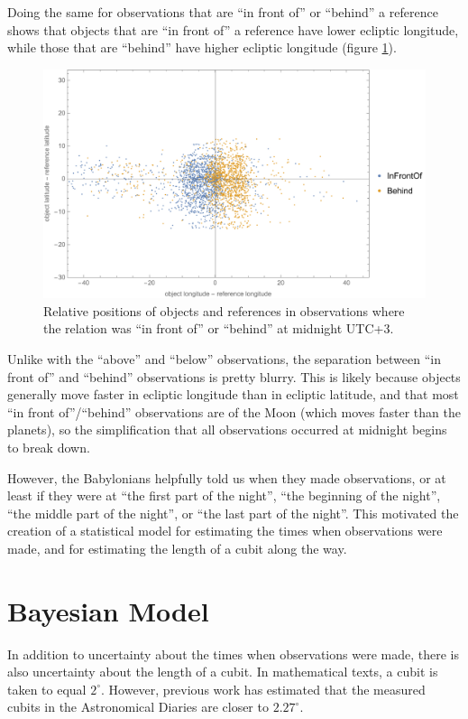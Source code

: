 \documentclass{article}
\begin{document}
Doing the same for observations that are ``in front of'' or ``behind'' a reference shows that objects that are ``in front of'' a reference have lower ecliptic longitude, while those that are ``behind'' have higher ecliptic longitude (figure \ref{fig:scatterInFrontOfBehind}).

\begin{figure}[h]
    \centering
    \includegraphics[width=0.7\linewidth]{infrontofBehindScatter.pdf}
    \caption{Relative positions of objects and references in observations where the relation was ``in front of'' or ``behind'' at midnight UTC+3.}
    \label{fig:scatterInFrontOfBehind}
\end{figure}

Unlike with the ``above'' and ``below'' observations, the separation between ``in front of'' and ``behind'' observations is pretty blurry. This is likely because objects generally move faster in ecliptic longitude than in ecliptic latitude, and that most ``in front of''/``behind'' observations are of the Moon (which moves faster than the planets), so the simplification that all observations occurred at midnight begins to break down.

However, the Babylonians helpfully told us when they made observations, or at least if they were at ``the first part of the night'', ``the beginning of the night'', ``the middle part of the night'', or ``the last part of the night''. This motivated the creation of a statistical model for estimating the times when observations were made, and for estimating the length of a cubit along the way.

\section{Bayesian Model}
In addition to uncertainty about the times when observations were made, there is also uncertainty about the length of a cubit. In mathematical texts, a cubit is taken to equal $2^\circ$\autocite{sachsHunger}. However, previous work has estimated that the measured cubits in the Astronomical Diaries are closer to $2.27^\circ$\autocite{jones}.
\end{document}
